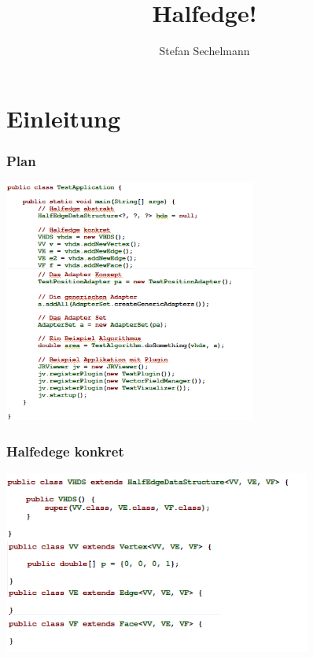 \documentclass[12pt]{beamer}
\title{\vspace{-1cm}Halfedge!}
\subtitle{}
\author{Stefan Sechelmann}
\date
\begin{document}
\maketitle





\section{Einleitung}

\begin{frame}
\frametitle{Plan}
\begin{center}
\includegraphics[height=8cm]{outline.png}\\	
\end{center}
\end{frame}

\begin{frame}
\frametitle{Halfedege konkret}
\begin{center}
\includegraphics[height=6cm]{Vhalfedge.png}\\	
\end{center}
\end{frame}
\end{document}

